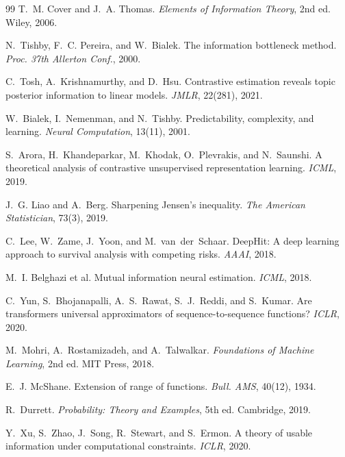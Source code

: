 \documentclass[11pt]{article}
\begin{document}

\begin{thebibliography}{99}
T.~M. Cover and J.~A. Thomas. \emph{Elements of Information Theory}, 2nd ed. Wiley, 2006.

N.~Tishby, F.~C. Pereira, and W.~Bialek. The information bottleneck method. \emph{Proc. 37th Allerton Conf.}, 2000.

C.~Tosh, A.~Krishnamurthy, and D.~Hsu. Contrastive estimation reveals topic posterior information to linear models. \emph{JMLR}, 22(281), 2021.

W.~Bialek, I.~Nemenman, and N.~Tishby. Predictability, complexity, and learning. \emph{Neural Computation}, 13(11), 2001.

S.~Arora, H.~Khandeparkar, M.~Khodak, O.~Plevrakis, and N.~Saunshi. A theoretical analysis of contrastive unsupervised representation learning. \emph{ICML}, 2019.

J.~G. Liao and A.~Berg. Sharpening Jensen's inequality. \emph{The American Statistician}, 73(3), 2019.

C.~Lee, W.~Zame, J.~Yoon, and M.~van~der~Schaar. DeepHit: A deep learning approach to survival analysis with competing risks. \emph{AAAI}, 2018.

M.~I. Belghazi et al. Mutual information neural estimation. \emph{ICML}, 2018.

C.~Yun, S.~Bhojanapalli, A.~S.~Rawat, S.~J.~Reddi, and S.~Kumar. Are transformers universal approximators of sequence-to-sequence functions? \emph{ICLR}, 2020.

M.~Mohri, A.~Rostamizadeh, and A.~Talwalkar. \emph{Foundations of Machine Learning}, 2nd ed. MIT Press, 2018.

E.~J. McShane. Extension of range of functions. \emph{Bull. AMS}, 40(12), 1934.

R.~Durrett. \emph{Probability: Theory and Examples}, 5th ed. Cambridge, 2019.

Y.~Xu, S.~Zhao, J.~Song, R.~Stewart, and S.~Ermon. A theory of usable information under computational constraints. \emph{ICLR}, 2020.

\end{thebibliography}
\end{document}
